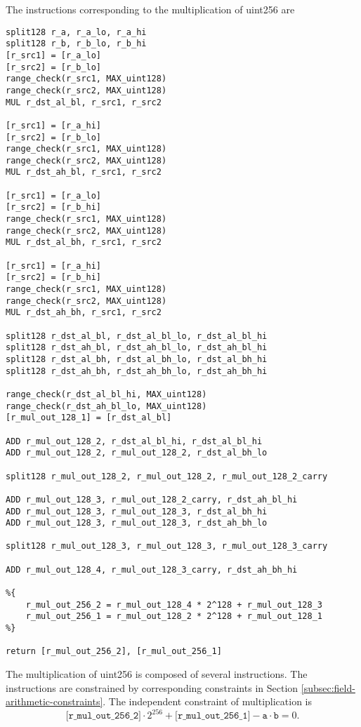 The instructions corresponding to the multiplication of uint256 are
\begin{lstlisting}[language={}]
split128 r_a, r_a_lo, r_a_hi
split128 r_b, r_b_lo, r_b_hi
[r_src1] = [r_a_lo]
[r_src2] = [r_b_lo]
range_check(r_src1, MAX_uint128)
range_check(r_src2, MAX_uint128)
MUL r_dst_al_bl, r_src1, r_src2

[r_src1] = [r_a_hi]
[r_src2] = [r_b_lo]
range_check(r_src1, MAX_uint128)
range_check(r_src2, MAX_uint128)
MUL r_dst_ah_bl, r_src1, r_src2

[r_src1] = [r_a_lo]
[r_src2] = [r_b_hi]
range_check(r_src1, MAX_uint128)
range_check(r_src2, MAX_uint128)
MUL r_dst_al_bh, r_src1, r_src2

[r_src1] = [r_a_hi]
[r_src2] = [r_b_hi]
range_check(r_src1, MAX_uint128)
range_check(r_src2, MAX_uint128)
MUL r_dst_ah_bh, r_src1, r_src2

split128 r_dst_al_bl, r_dst_al_bl_lo, r_dst_al_bl_hi
split128 r_dst_ah_bl, r_dst_ah_bl_lo, r_dst_ah_bl_hi
split128 r_dst_al_bh, r_dst_al_bh_lo, r_dst_al_bh_hi
split128 r_dst_ah_bh, r_dst_ah_bh_lo, r_dst_ah_bh_hi

range_check(r_dst_al_bl_hi, MAX_uint128)
range_check(r_dst_ah_bl_lo, MAX_uint128)
[r_mul_out_128_1] = [r_dst_al_bl]

ADD r_mul_out_128_2, r_dst_al_bl_hi, r_dst_al_bl_hi
ADD r_mul_out_128_2, r_mul_out_128_2, r_dst_al_bh_lo

split128 r_mul_out_128_2, r_mul_out_128_2, r_mul_out_128_2_carry

ADD r_mul_out_128_3, r_mul_out_128_2_carry, r_dst_ah_bl_hi
ADD r_mul_out_128_3, r_mul_out_128_3, r_dst_al_bh_hi
ADD r_mul_out_128_3, r_mul_out_128_3, r_dst_ah_bh_lo

split128 r_mul_out_128_3, r_mul_out_128_3, r_mul_out_128_3_carry

ADD r_mul_out_128_4, r_mul_out_128_3_carry, r_dst_ah_bh_hi

%{
    r_mul_out_256_2 = r_mul_out_128_4 * 2^128 + r_mul_out_128_3
    r_mul_out_256_1 = r_mul_out_128_2 * 2^128 + r_mul_out_128_1
%}

return [r_mul_out_256_2], [r_mul_out_256_1]
\end{lstlisting}

The multiplication of uint256 is composed of several instructions. The instructions are constrained by corresponding constraints in Section \ref{subsec:field-arithmetic-constraints}. The independent constraint of multiplication is
\[ \texttt{[r\_mul\_out\_256\_2]} \cdot 2^{256} + \texttt{[r\_mul\_out\_256\_1]} - \texttt{a} \cdot \texttt{b} = 0. \]


